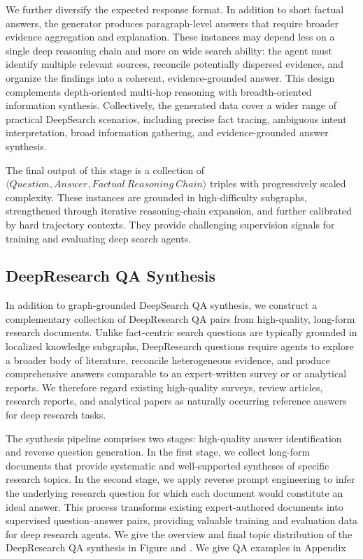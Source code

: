 \documentclass{huawei}
\begin{document}
We further diversify the expected response format. In addition to short factual answers, the generator produces paragraph-level answers that require broader evidence aggregation and explanation. These instances may depend less on a single deep reasoning chain and more on wide search ability: the agent must identify multiple relevant sources, reconcile potentially dispersed evidence, and organize the findings into a coherent, evidence-grounded answer. This design complements depth-oriented multi-hop reasoning with breadth-oriented information synthesis. Collectively, the generated data cover a wider range of practical DeepSearch scenarios, including precise fact tracing, ambiguous intent interpretation, broad information gathering, and evidence-grounded answer synthesis.



The final output of this stage is a collection of $\langle Question, Answer, Factual \ Reasoning \ Chain \rangle$ triples with progressively scaled complexity. These instances are grounded in high-difficulty subgraphs, strengthened through iterative reasoning-chain expansion, and further calibrated by hard trajectory contexts. They provide challenging supervision signals for training and evaluating deep search agents.




\subsection{DeepResearch QA Synthesis}
In addition to graph-grounded DeepSearch QA synthesis, we construct a complementary collection of DeepResearch QA pairs from high-quality, long-form research documents. Unlike fact-centric search questions are typically grounded in localized knowledge subgraphs, DeepResearch questions require agents to explore a broader body of literature, reconcile heterogeneous evidence, and produce comprehensive answers comparable to an expert-written survey or or analytical reports. We therefore regard existing high-quality surveys, review articles, research reports, and analytical papers as naturally occurring reference answers for deep research tasks.

The synthesis pipeline comprises two stages: high-quality answer identification and reverse question generation. In the first stage, we collect long-form documents that provide systematic and well-supported syntheses of specific research topics. In the second stage, we apply reverse prompt engineering to infer the underlying research question for which each document would constitute an ideal answer. This process transforms existing expert-authored documents into supervised question–answer pairs, providing valuable training and evaluation data for deep research agents.
We give the overview and final topic distribution of the DeepResearch QA synthesis in Figure  and . We give QA examples in Appendix 
\end{document}
